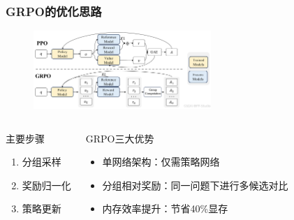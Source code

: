 \documentclass[8pt,aspectratio=169]{beamer}
\begin{document}
\begin{frame}
    \frametitle{GRPO的优化思路}
    \begin{figure}
        \includegraphics[width=0.6\textwidth]{GRPO/PPOvsGRPO.png}
    \end{figure}
    \begin{columns}[T]
        \begin{block}{主要步骤}
            \begin{enumerate}
                \item 分组采样
                \item 奖励归一化
                \item 策略更新
            \end{enumerate}
        \end{block}
        \begin{block}{GRPO三大优势}
            \begin{itemize}
                \item 单网络架构：仅需策略网络
                \item 分组相对奖励：同一问题下进行多候选对比
                \item 内存效率提升：节省40\%显存
            \end{itemize}
        \end{block}
    \end{columns} 
\end{frame}
\end{document}
